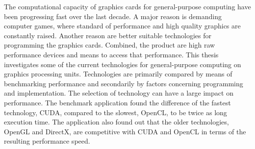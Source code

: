 The computational capacity of graphics cards for general-purpose computing have been progressing fast over the last decade. A major reason is demanding computer games, where standard of performance and high quality graphics are constantly raised. Another reason are better suitable technologies for programming the graphics cards. Combined, the product are high raw performance devices and means to access that performance. This thesis investigates some of the current technologies for general-purpose computing on graphics processing units. Technologies are primarily compared by means of benchmarking performance and secondarily by factors concerning programming and implementation. The selection of technology can have a large impact on performance. The benchmark application found the difference of the fastest technology, CUDA, compared to the slowest, OpenCL, to be twice as long execution time. The application also found out that the older technologies, OpenGL and DirectX, are competitive with CUDA and OpenCL in terms of the resulting performance speed.%
%
%
%
